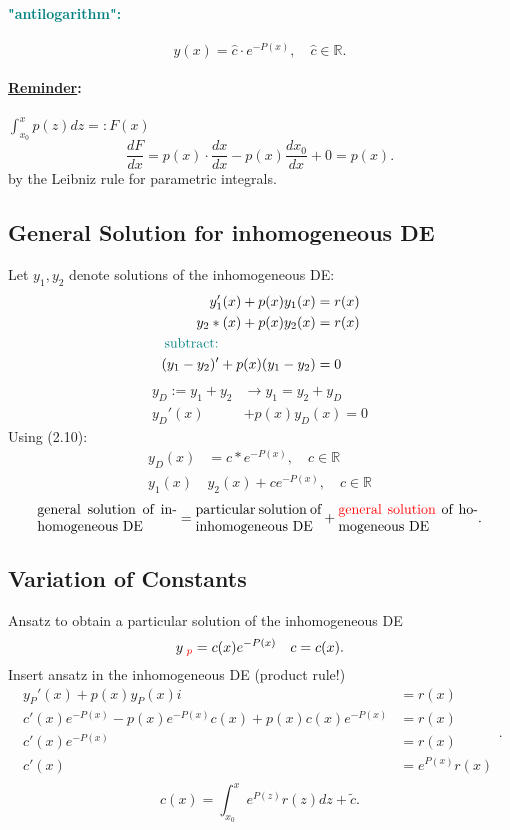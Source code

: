 \documentclass[]{article}
\begin{document}
		\paragraph{ \textcolor{teal}{"antilogarithm":}} \[
			y(x)=\hat c \cdot e ^{-P(x)},\quad \hat c\in \mathbb R
		.\]
		\paragraph{ \underline{Reminder}:} $ \int_{x_0}^{x} p(z)dz =: F(x)$
		\[
		\frac{dF}{dx}=p(x) \cdot  \frac{dx}{dx}-p(x) \frac{dx_0}{dx}+0 =p(x)
		.\]
		by the Leibniz rule for parametric integrals.
\subsection{General Solution for inhomogeneous DE}
Let $y_1,y_2$ denote solutions of the inhomogeneous DE:
\[
\begin{split}
	y_1'(x)+p(x)y_1(x) &=r(x)\\
	y_2*(x)+p(x)y_2(x) &=r(x)\\
	\text{ \textcolor{teal}{subtract:}}\quad\quad\quad\quad\quad\quad\quad& ~  \\
	(y_1-y_2)'+p(x)(y_1-y_2)&=0
\end{split}
\]
\[
\begin{split}
	y_D:=y_1+y_2 &\rightarrow y_1=y_2+y_D\\
	y_D'(x) &+p(x)y_D(x)=0
\end{split}
\]
Using (2.10):
\[
\begin{split}
	y_D(x) & =c*e ^{-P(x)},\quad c\in \mathbb R  \\
	y_1(x) & y_2(x)+c e ^{-P(x)},\quad c\in \mathbb R
\end{split}
\]
\[
	\parbox{10em}{general solution of inhomogeneous DE}=\parbox{9em}{particular solution of inhomogeneous DE}+\parbox{10em}{ \textcolor{red}{general solution} of homogeneous DE}
.\]
\subsection{Variation of Constants}
Ansatz to obtain a particular solution of the inhomogeneous DE
\[
	y_{ \text{ \textcolor{red}{$p$}}}=c(x) e ^{-P(x)}\quad c=c(x)
.\]
Insert ansatz in the inhomogeneous DE (product rule!)
\[
\begin{split}
	y_P'(x)+p(x)y_P(x)i &=r(x)\\
	c'(x)e ^{-P(x)}-p(x)e ^{-P(x)}c(x)+p(x)c(x)e ^{-P(x)} &= r(x)\\
	c'(x) e ^{-P(x)}&=r(x)\\
	c'(x)&=e ^{P(x)}r(x)\\
\end{split}
.\]
\[
	c(x)= \int_{x_0}^{x} e ^{P(z)}r(z) dz+\tilde c
.\]
\end{document}
